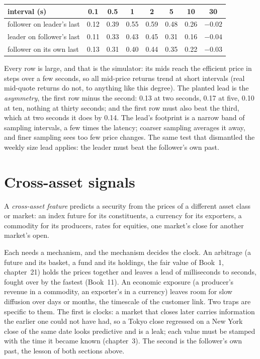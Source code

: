 \begin{center}
\small
\begin{tabular}{@{}lccccccc@{}}
\toprule
interval (s) & 0.1 & 0.5 & 1 & 2 & 5 & 10 & 30\\
\midrule
follower on leader's last & 0.12 & 0.39 & 0.55 & 0.59 & 0.48 & 0.26 & $-0.02$\\
leader on follower's last & 0.11 & 0.33 & 0.43 & 0.45 & 0.31 & 0.16 & $-0.04$\\
follower on its own last & 0.13 & 0.31 & 0.40 & 0.44 & 0.35 & 0.22 & $-0.03$\\
\bottomrule
\end{tabular}
\end{center}

Every row is large, and that is the simulator: its mids reach the efficient price in steps over a few seconds, so all mid-price
returns trend at short intervals (real mid-quote returns do not, to anything like this degree). The planted lead is the
\emph{asymmetry}, the first row minus the second: 0.13 at two seconds, 0.17 at five, 0.10 at ten, nothing at thirty seconds;
and the first row must also beat the third, which at two seconds it does by 0.14. The lead's footprint is a narrow band of sampling intervals, a few times the latency; coarser sampling averages it away,
and finer sampling sees too few price changes. The same test that dismantled the weekly size lead applies: the leader must beat
the follower's own past.

\section{Cross-asset signals}

\begin{definition}\label{def:rs:cross-sectional-and-cross-asset-features:crossasset}
A \emph{cross-asset feature} predicts a security from the prices of a different asset class or market:
an index future for its constituents, a currency for its exporters, a commodity for its producers, rates for equities, one market's
close for another market's open.
\end{definition}

Each needs a mechanism, and the mechanism decides the clock. An arbitrage (a future and its basket, a fund and its holdings, the
fair value of Book~1, chapter~21) holds the prices together and leaves a lead of milliseconds to seconds, fought over by the fastest (Book~11). An economic exposure (a producer's revenue in a commodity, an exporter's in a currency) leaves room for
slow diffusion over days or months, the timescale of the customer link. Two traps are specific to them. The first is clocks: a
market that closes later carries information the earlier one could not have had, so a Tokyo close regressed on a New York close of
the same date looks predictive and is a leak; each value must be stamped with the time it became known (chapter~3). The second is
the follower's own past, the lesson of both sections above.

